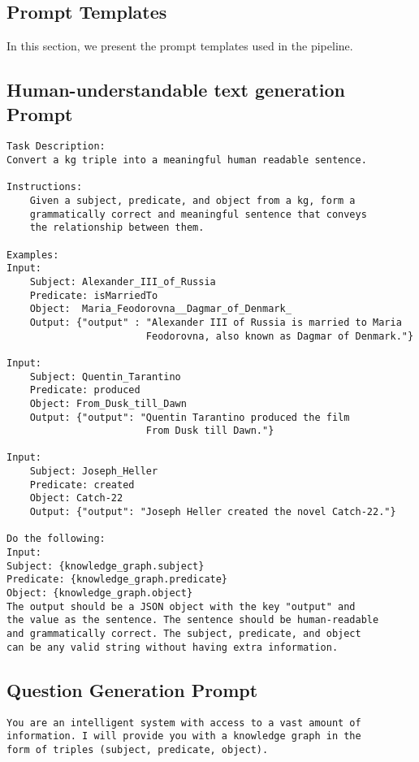 \begin{appendices}
    \chapter{Prompt Templates}\label{ch:prompt-templates}
    In this section, we present the prompt templates used in the pipeline.
    \section{Human-understandable text generation Prompt}\label{sec:prompt-templates:human-understandable}
    \begin{Verbatim}[fontsize=\small, frame=single, label={Prompt template for generating human-readable text}]
Task Description:
Convert a kg triple into a meaningful human readable sentence.

Instructions:
    Given a subject, predicate, and object from a kg, form a
    grammatically correct and meaningful sentence that conveys
    the relationship between them.

Examples:
Input:
    Subject: Alexander_III_of_Russia
    Predicate: isMarriedTo
    Object:  Maria_Feodorovna__Dagmar_of_Denmark_
    Output: {"output" : "Alexander III of Russia is married to Maria
                        Feodorovna, also known as Dagmar of Denmark."}

Input:
    Subject: Quentin_Tarantino
    Predicate: produced
    Object: From_Dusk_till_Dawn
    Output: {"output": "Quentin Tarantino produced the film
                        From Dusk till Dawn."}

Input:
    Subject: Joseph_Heller
    Predicate: created
    Object: Catch-22
    Output: {"output": "Joseph Heller created the novel Catch-22."}

Do the following:
Input:
Subject: {knowledge_graph.subject}
Predicate: {knowledge_graph.predicate}
Object: {knowledge_graph.object}
The output should be a JSON object with the key "output" and
the value as the sentence. The sentence should be human-readable
and grammatically correct. The subject, predicate, and object
can be any valid string without having extra information.
    \end{Verbatim}
    \section{Question Generation Prompt}\label{sec:prompt-templates:10-question}
    \begin{Verbatim}[fontsize=\small, frame=single, label={Prompt template for generating 10 questions for each triple}]
You are an intelligent system with access to a vast amount of
information. I will provide you with a knowledge graph in the
form of triples (subject, predicate, object).


\end{Verbatim}
\end{appendices}
